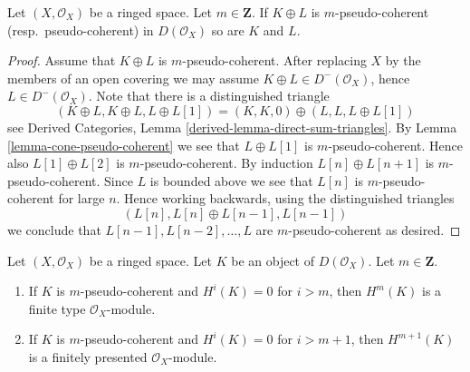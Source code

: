 \begin{lemma}
\label{lemma-summands-pseudo-coherent}
Let $(X, \mathcal{O}_X)$ be a ringed space. Let $m \in \mathbf{Z}$.
If $K \oplus L$ is $m$-pseudo-coherent (resp.\ pseudo-coherent)
in $D(\mathcal{O}_X)$ so are $K$ and $L$.
\end{lemma}

\begin{proof}
Assume that $K \oplus L$ is $m$-pseudo-coherent.
After replacing $X$ by the members of an open covering we may
assume $K \oplus L \in D^-(\mathcal{O}_X)$, hence
$L \in D^-(\mathcal{O}_X)$.
Note that there is a distinguished triangle
$$
(K \oplus L, K \oplus L, L \oplus L[1]) =
(K, K, 0) \oplus (L, L, L \oplus L[1])
$$
see
Derived Categories, Lemma \ref{derived-lemma-direct-sum-triangles}.
By
Lemma \ref{lemma-cone-pseudo-coherent}
we see that $L \oplus L[1]$ is $m$-pseudo-coherent.
Hence also $L[1] \oplus L[2]$ is $m$-pseudo-coherent.
By induction $L[n] \oplus L[n + 1]$ is $m$-pseudo-coherent.
Since $L$ is bounded above we see that $L[n]$ is $m$-pseudo-coherent
for large $n$. Hence working backwards, using the distinguished triangles
$$
(L[n], L[n] \oplus L[n - 1], L[n - 1])
$$
we conclude that $L[n - 1], L[n - 2], \ldots, L$ are $m$-pseudo-coherent
as desired.
\end{proof}

\begin{lemma}
\label{lemma-finite-cohomology}
Let $(X, \mathcal{O}_X)$ be a ringed space.
Let $K$ be an object of $D(\mathcal{O}_X)$.
Let $m \in \mathbf{Z}$.
\begin{enumerate}
\item If $K$ is $m$-pseudo-coherent and $H^i(K) = 0$
for $i > m$, then $H^m(K)$ is a finite type $\mathcal{O}_X$-module.
\item If $K$ is $m$-pseudo-coherent and $H^i(K) = 0$
for $i > m + 1$, then $H^{m + 1}(K)$ is a finitely presented
$\mathcal{O}_X$-module.
\end{enumerate}
\end{lemma}

